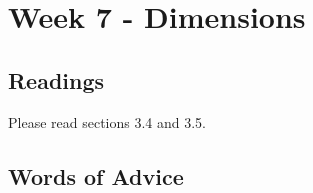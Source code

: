 	\clearpage



	\section{Week 7 - Dimensions}

	\subsection{Readings}
		Please read sections 3.4 and 3.5.

	\subsection{Words of Advice}
